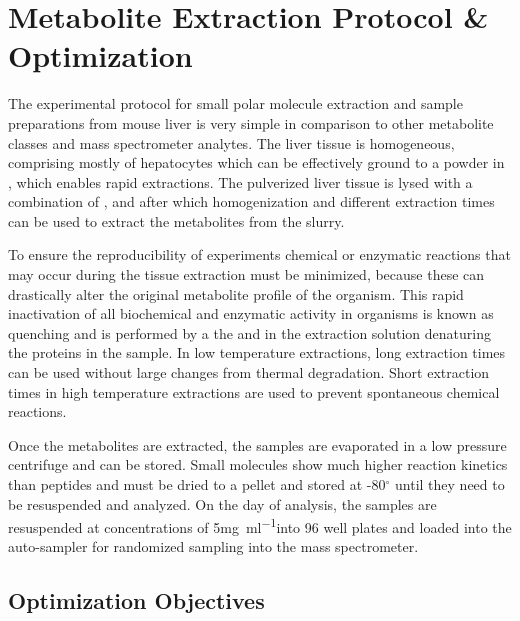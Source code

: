 \documentclass[a4paper]{book}
\begin{document}
	
	
	
	\section{Metabolite Extraction Protocol \& Optimization}
	
	The experimental protocol for small polar molecule extraction and sample preparations from mouse liver is very simple in comparison to other metabolite classes and mass spectrometer analytes\citep{Mushtaq2014ExtractionMetabolome,Haynes2009Sphingolipidomics:Sphingolipids,Hu2009AnalyticalDiscovery}. The liver tissue is homogeneous, comprising mostly of hepatocytes which can be effectively ground to a powder in , which enables rapid extractions. The pulverized liver tissue is lysed with a combination of ,  and  after which homogenization and different extraction times can be used to extract the metabolites from the slurry. 
	
	To ensure the reproducibility of experiments  chemical or enzymatic reactions that may occur during the tissue extraction must be minimized, because these can drastically alter the original metabolite profile of the organism\citep{Mushtaq2014ExtractionMetabolome}. This rapid inactivation of all biochemical and enzymatic activity in organisms is known as quenching and is performed by a the  and  in the extraction solution denaturing the proteins in the sample. In low temperature extractions, long extraction times can be used without large changes from thermal degradation. Short extraction times in high temperature extractions are used to prevent spontaneous chemical reactions. 
	
	Once the metabolites are extracted, the samples are evaporated in a low pressure centrifuge and can be stored. Small molecules show much higher reaction kinetics than peptides and must be dried to a pellet and stored at -80$^{\circ}$ until they need to be resuspended and analyzed. On the day of analysis, the samples are resuspended at concentrations of 5\si{\milli\gram\per\milli\litre}into 96 well plates and loaded into the auto-sampler for randomized sampling into the mass spectrometer.
	
	\subsection{Optimization Objectives}
	
\end{document}
